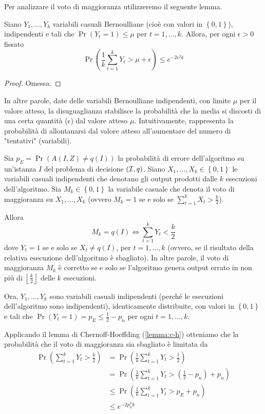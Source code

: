 Per analizzare il voto di maggioranza utilizzeremo il seguente lemma. \\

\begin{lemma}
    \label{lemma:c-h}
    Siano $Y_1, \dots, Y_k$ variabili casuali Bernoulliane (cioè con valori in $\left\{0,1\right\}$), indipendenti e tali che $\Pr(Y_t = 1) \leq \mu$ per $t = 1, \dots, k$. Allora, per ogni $\epsilon > 0$ fissato
    $$ \Pr \left(\frac{1}{k} \sum_{t=1}^{k} Y_t > \mu + \epsilon\right) \leq e^{-2 \epsilon^2 k} $$
\end{lemma}
\begin{proof}
    Omessa.
\end{proof}

In altre parole, date delle variabili Bernoulliane indipendenti, con limite $\mu$ per il valore atteso, la disuguaglianza stabilisce la probabilità che la media si discosti di una certa quantità ($\epsilon$) dal valore atteso $\mu$. Intuitivamente, rappresenta la probabilità di allontanarsi dal valore atteso all'aumentare del numero di "tentativi" (variabili).

Sia $p_E = \Pr \left(A(I,Z) \neq q(I)\right)$ la probabilità di errore dell'algoritmo su un'istanza $I$ del problema di decisione $(\mathcal{I}, q)$. Siano $X_1, \dots, X_k \in \left\{0,1\right\}$ le variabili casuali indipendenti che denotano gli output prodotti dalle $k$ esecuzioni dell'algoritmo. Sia $M_k \in \left\{0,1\right\}$ la variabile casuale che denota il voto di maggioranza su $X_1, \dots, X_k$ (ovvero $M_k = 1$ se e solo se $\sum_{t=1}^k X_t > \frac{k}{2}$).

Allora
$$ M_k = q(I) \Longleftrightarrow \sum_{t=1}^k Y_t < \frac{k}{2} $$
dove $Y_t = 1$ se e solo se $X_t \neq q(I)$, per $t = 1, \dots, k$ (ovvero, se il risultato della relativa esecuzione dell'algoritmo è sbagliato). In altre parole, il voto di maggioranza $M_k$ è corretto se e solo se l'algoritmo genera output errato in non più di $\left\lfloor\frac{k}{2}\right\rfloor$ delle $k$ esecuzioni.

Ora, $Y_1, \dots, Y_k$ sono variabili casuali indipendenti (perché le esecuzioni dell'algoritmo sono indipendenti), identicamente distribuite, con valori in $\left\{0,1\right\}$ e tali che $\Pr (Y_t = 1) = p_E \leq \frac{1}{2} - p_n$ per ogni $t = 1, \dots, k$.

Applicando il lemma di Chernoff-Hoeffding (\ref{lemma:c-h}) otteniamo che la probabilità che il voto di maggioranza sia sbagliato è limitata da
\begin{align*}
    \Pr \left(\sum_{t=1}^k Y_t > \frac{k}{2}\right) & = \Pr \left(\frac{1}{k} \sum_{t=1}^k Y_t > \frac{1}{2} \right) \\
    & = \Pr \left(\frac{1}{k} \sum_{t=1}^k Y_t > \left(\frac{1}{2} - p_n\right) + p_n \right)  \\
    & \leq \Pr \left(\frac{1}{k} \sum_{t=1}^k Y_t > p_E + p_n \right)  \\
    & \leq e^{-2p_n^2 k}
\end{align*}

